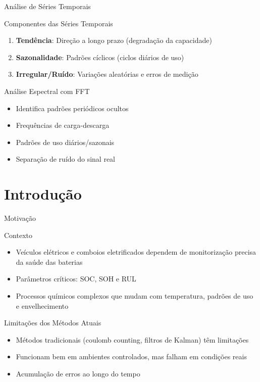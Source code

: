 \documentclass[aspectratio=169,xcolor=dvipsnames]{beamer}
\begin{document}
\begin{frame}{Análise de Séries Temporais}
  \begin{block}{Componentes das Séries Temporais}
    \begin{enumerate}
      \item \textbf{Tendência}: Direção a longo prazo (degradação da capacidade)
      \item \textbf{Sazonalidade}: Padrões cíclicos (ciclos diários de uso)
      \item \textbf{Irregular/Ruído}: Variações aleatórias e erros de medição
    \end{enumerate}
  \end{block}
  
  \begin{exampleblock}{Análise Espectral com FFT}
    \begin{itemize}
      \item Identifica padrões periódicos ocultos
      \item Frequências de carga-descarga
      \item Padrões de uso diários/sazonais
      \item Separação de ruído do sinal real
    \end{itemize}
  \end{exampleblock}
\end{frame}

\section{Introdução}
\begin{frame}{Motivação}
  \begin{block}{Contexto}
    \begin{itemize}
      \item Veículos elétricos e comboios eletrificados dependem de monitorização precisa da saúde das baterias
      \item Parâmetros críticos: SOC, SOH e RUL
      \item Processos químicos complexos que mudam com temperatura, padrões de uso e envelhecimento
    \end{itemize}
  \end{block}
  
  \begin{alertblock}{Limitações dos Métodos Atuais}
    \begin{itemize}
      \item Métodos tradicionais (coulomb counting, filtros de Kalman) têm limitações
      \item Funcionam bem em ambientes controlados, mas falham em condições reais
      \item Acumulação de erros ao longo do tempo
    \end{itemize}
  \end{alertblock}
\end{frame}
\end{document}
